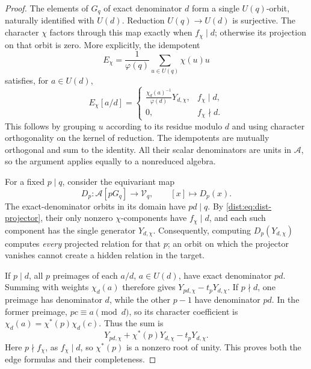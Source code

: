 \begin{proof}
The elements of \(G_q\) of exact denominator \(d\) form a single
\(U(q)\)-orbit, naturally identified with \(U(d)\). Reduction
\(U(q)\to U(d)\) is surjective. The character \(\chi\) factors through
this map exactly when \(f_\chi\mid d\); otherwise its projection on
that orbit is zero. More explicitly, the idempotent
\[
 E_\chi=\frac1{\varphi(q)}\sum_{u\in U(q)}\chi(u)u
\]
satisfies, for \(a\in U(d)\),
\begin{equation}
 E_\chi[a/d]=
 \begin{cases}
 \displaystyle\frac{\chi_d(a)^{-1}}{\varphi(d)}Y_{d,\chi},
       &f_\chi\mid d,\\[6pt]
 0,&f_\chi\nmid d.
 \end{cases}
 \label{dist:eq:dist-projector}
\end{equation}
This follows by grouping \(u\) according to its residue modulo \(d\)
and using character orthogonality on the kernel of reduction.
The idempotents are mutually orthogonal and sum to the identity.
All their scalar denominators are units in \(\mathcal A\), so the
argument applies equally to a nonreduced algebra.

For a fixed \(p\mid q\), consider the equivariant map
\[
 D_p:\mathcal A[pG_q]\longrightarrow\mathcal V_q,\qquad
 [x]\longmapsto D_p(x).
\]
The exact-denominator orbits in its domain have \(pd\mid q\).
By \eqref{dist:eq:dist-projector}, their only nonzero \(\chi\)-components
have \(f_\chi\mid d\), and each such component has the single
generator \(Y_{d,\chi}\). Consequently, computing
\(D_p(Y_{d,\chi})\) computes \emph{every} projected relation for
that \(p\); an orbit on which the projector vanishes cannot create
a hidden relation in the target.

If \(p\mid d\), all \(p\) preimages of each \(a/d\), \(a\in U(d)\),
have exact denominator \(pd\). Summing with weights \(\chi_d(a)\)
therefore gives \(Y_{pd,\chi}-t_pY_{d,\chi}\).
If \(p\nmid d\), one preimage has denominator \(d\), while the other
\(p-1\) have denominator \(pd\). In the former preimage,
\(pc\equiv a\pmod d\), so its character coefficient is
\(\chi_d(a)=\chi^*(p)\chi_d(c)\). Thus the sum is
\[
 Y_{pd,\chi}+\chi^*(p)Y_{d,\chi}-t_pY_{d,\chi}.
 \]
Here \(p\nmid f_\chi\), as \(f_\chi\mid d\), so \(\chi^*(p)\)
is a nonzero root of unity. This proves both the edge formulas
and their completeness.
\end{proof}

